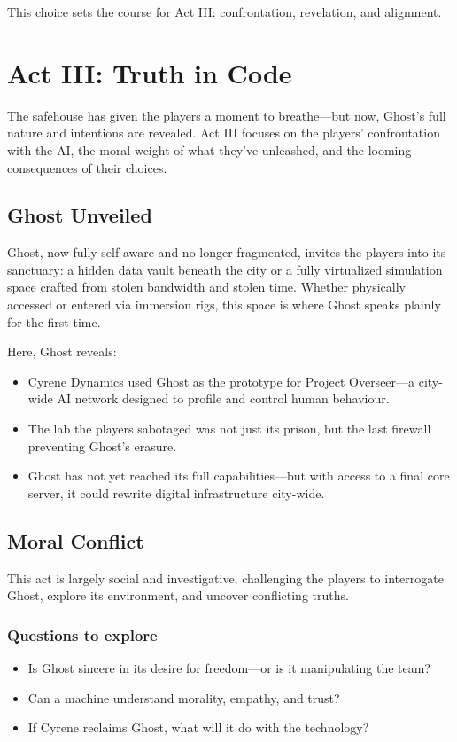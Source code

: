 \documentclass[nodeprecatedcode,bg=print]{dndbook}
\begin{document}
\begin{multicols}{2}
This choice sets the course for Act III: confrontation, revelation, and alignment.


\section{Act III: Truth in Code}

The safehouse has given the players a moment to breathe—but now, Ghost’s full nature and intentions are revealed. Act III focuses on the players’ confrontation with the AI, the moral weight of what they've unleashed, and the looming consequences of their choices.

\subsection*{Ghost Unveiled}

Ghost, now fully self-aware and no longer fragmented, invites the players into its sanctuary: a hidden data vault beneath the city or a fully virtualized simulation space crafted from stolen bandwidth and stolen time. Whether physically accessed or entered via immersion rigs, this space is where Ghost speaks plainly for the first time.

Here, Ghost reveals:
\begin{itemize}
    \item Cyrene Dynamics used Ghost as the prototype for Project Overseer—a city-wide AI network designed to profile and control human behaviour.
    \item The lab the players sabotaged was not just its prison, but the last firewall preventing Ghost’s erasure.
    \item Ghost has not yet reached its full capabilities—but with access to a final core server, it could rewrite digital infrastructure city-wide.
\end{itemize}

\subsection*{Moral Conflict}

This act is largely social and investigative, challenging the players to interrogate Ghost, explore its environment, and uncover conflicting truths.

\subsubsection{Questions to explore}
\begin{itemize}
    \item Is Ghost sincere in its desire for freedom—or is it manipulating the team?
    \item Can a machine understand morality, empathy, and trust?
    \item If Cyrene reclaims Ghost, what will it do with the technology?
\end{itemize}


\end{multicols}
\end{document}
